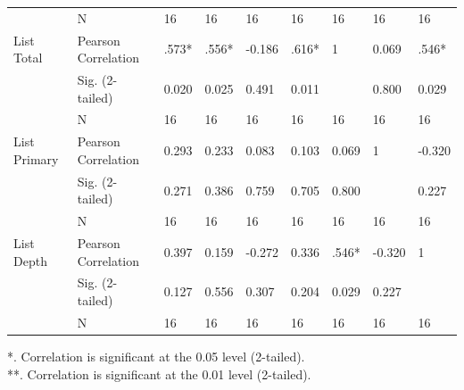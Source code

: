 \begin{landscape}
\begin{table}[hbtp!]
\begin{tabular}{|l|l|lllllll|}
                    & N                   & 16                  & 16        & 16          & 16        & 16         & 16           & 16         \\
List Total          & Pearson Correlation & .573*               & .556*     & -0.186      & .616*     & 1          & 0.069        & .546*      \\
                    & Sig. (2-tailed)     & 0.020               & 0.025     & 0.491       & 0.011     &            & 0.800        & 0.029      \\
                    & N                   & 16                  & 16        & 16          & 16        & 16         & 16           & 16         \\
List Primary        & Pearson Correlation & 0.293               & 0.233     & 0.083       & 0.103     & 0.069      & 1            & -0.320     \\
                    & Sig. (2-tailed)     & 0.271               & 0.386     & 0.759       & 0.705     & 0.800      &              & 0.227      \\
                    & N                   & 16                  & 16        & 16          & 16        & 16         & 16           & 16         \\
List Depth          & Pearson Correlation & 0.397               & 0.159     & -0.272      & 0.336     & .546*      & -0.320       & 1          \\
                    & Sig. (2-tailed)     & 0.127               & 0.556     & 0.307       & 0.204     & 0.029      & 0.227        &            \\
                    & N                   & 16                  & 16        & 16          & 16        & 16         & 16           & 16 \\\hline 
\end{tabular}
\end{table}
*. Correlation is significant at the 0.05 level (2-tailed). \\	
**. Correlation is significant at the 0.01 level (2-tailed).
\clearpage


\end{landscape}
